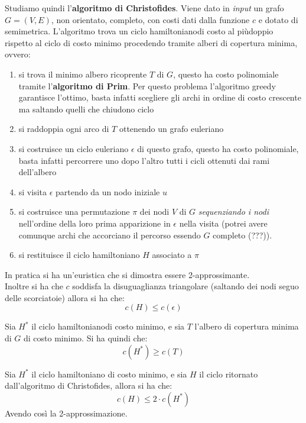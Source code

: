 Studiamo quindi l'\textbf{algoritmo di Christofides}. Viene dato in \textit{input} un
grafo $G=(V,E)$, non orientato, completo, con costi dati dalla funzione $c$ e
dotato di semimetrica. 
L'algoritmo trova un ciclo hamiltonianodi costo al piùdoppio rispetto al ciclo
di costo minimo procedendo tramite alberi di copertura minima, ovvero:
\begin{enumerate}
  \item si trova il minimo albero ricoprente $T$ di $G$, questo ha costo
  polinomiale tramite l'\textbf{algoritmo di Prim}. Per questo problema
  l’algoritmo greedy garantisce l’ottimo, basta infatti scegliere gli archi in
  ordine di costo crescente ma saltando quelli che chiudono ciclo
  \item si raddoppia ogni arco di $T$ ottenendo un grafo euleriano
  \item si costruisce un ciclo euleriano $\epsilon$ di questo grafo, questo ha
  costo polinomiale, basta infatti percorrere uno dopo l’altro tutti i cicli
  ottenuti dai rami dell’albero 
  \item si visita $\epsilon$ partendo da un nodo iniziale $u$
  \item si costruisce una permutazione $\pi$ dei nodi $V$ di $G$
  \textit{sequenziando i nodi} nell’ordine della loro prima apparizione in
  $\epsilon$ nella visita (potrei avere comunque archi che accorciano il
  percorso essendo $G$ completo (???)). 
  \item si restituisce il ciclo hamiltoniano $H$ associato a $\pi$
\end{enumerate}
In pratica si ha un'euristica che si dimostra essere 2-approssimante.\\
Inoltre si ha che $c$ soddisfa la disuguaglianza triangolare (saltando dei nodi
seguo delle scorciatoie) allora si ha che:
\[c(H)\leq c(\epsilon)\]
\begin{teorema}
  Sia $H^*$ il ciclo hamiltonianodi costo minimo, e sia $T$ l'albero di
  copertura minima di $G$ di costo minimo. Si ha quindi che:
  \[c(H^*)\geq c(T)\]
\end{teorema}
\begin{teorema}
  Sia $H^*$ il ciclo hamiltoniano di costo minimo, e sia $H$ il ciclo ritornato
  dall’algoritmo di Christofides, allora si ha che:
  \[c(H)\leq 2\cdot c(H^*)\]
  Avendo così la 2-approssimazione.
\end{teorema}
